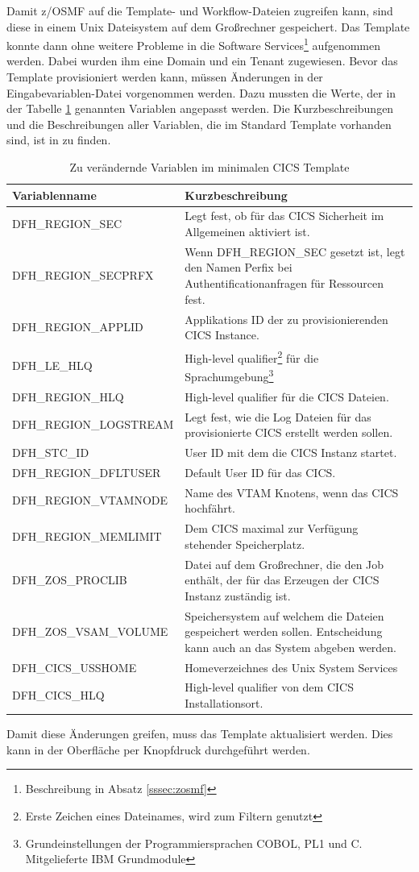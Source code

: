 Damit z/OSMF auf die Template- und Workflow-Dateien zugreifen kann, sind diese in einem Unix Dateisystem auf dem Großrechner gespeichert.
Das Template konnte dann ohne weitere Probleme in die Software Services\footnote{Beschreibung in Absatz \ref{sssec:zosmf}} aufgenommen werden.
Dabei wurden ihm eine Domain und ein Tenant zugewiesen.
Bevor das Template provisioniert werden kann, müssen Änderungen in der Eingabevariablen-Datei vorgenommen werden.
Dazu mussten die Werte, der in der Tabelle \ref{tab:cgsvars} genannten Variablen angepasst werden.
Die Kurzbeschreibungen und die Beschreibungen aller Variablen, die im Standard Template vorhanden sind, ist in \cite{IBM.2019} zu finden.
\begin{table}[h]
\centering
\begin{tabularx}{\textwidth}{X|X}
Variablenname & Kurzbeschreibung \\
\hline
DFH\_REGION\_SEC & Legt fest, ob für das CICS Sicherheit im Allgemeinen aktiviert ist. \\
\hline
DFH\_REGION\_SECPRFX & Wenn DFH\_REGION\_SEC gesetzt ist, legt den Namen Perfix bei Authentificationanfragen für Ressourcen fest. \\
\hline
DFH\_REGION\_APPLID & Applikations ID der zu provisionierenden CICS Instance. \\
\hline
DFH\_LE\_HLQ & High-level qualifier\footnote{Erste Zeichen eines Dateinames, wird zum Filtern genutzt} für die Sprachumgebung\footnote{Grundeinstellungen der Programmiersprachen COBOL, PL1 und C. Mitgelieferte IBM Grundmodule} \\
\hline
DFH\_REGION\_HLQ & High-level qualifier für die CICS Dateien.\\
\hline
DFH\_REGION\_LOGSTREAM & Legt fest, wie die Log Dateien für das provisionierte CICS erstellt werden sollen. \\
\hline
DFH\_STC\_ID & User ID mit dem die CICS Instanz startet. \\
\hline
DFH\_REGION\_DFLTUSER & Default User ID für das CICS. \\
\hline
DFH\_REGION\_VTAMNODE & Name des VTAM Knotens, wenn das CICS hochfährt. \\
\hline
DFH\_REGION\_MEMLIMIT & Dem CICS maximal zur Verfügung stehender Speicherplatz. \\
\hline
DFH\_ZOS\_PROCLIB & Datei auf dem Großrechner, die den Job enthält, der für das Erzeugen der CICS Instanz zuständig ist. \\
\hline
DFH\_ZOS\_VSAM\_VOLUME & Speichersystem auf welchem die Dateien gespeichert werden sollen. Entscheidung kann auch an das System abgeben werden. \\
\hline
DFH\_CICS\_USSHOME & Homeverzeichnes des Unix System Services \\
\hline
DFH\_CICS\_HLQ & High-level qualifier von dem CICS Installationsort. \\
\end{tabularx}
\caption{Zu verändernde Variablen im minimalen CICS Template}
\label{tab:cgsvars}
\end{table}
Damit diese Änderungen greifen, muss das Template aktualisiert werden.
Dies kann in der Oberfläche per Knopfdruck durchgeführt werden.

